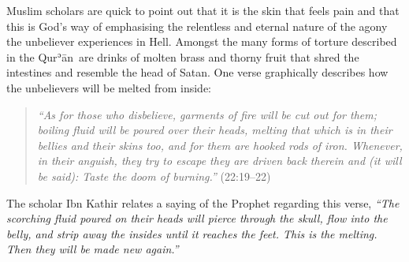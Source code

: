 \documentclass[12pt]{memoir}
\def\´{ʾ} %
\def \Quran{Qur\-\´ān} %
\newcommand{\QRef}[1]{{\color{darkblue}#1}}
\begin{document}
Muslim scholars are quick to point out that it is the skin
that feels pain and that this is God’s way of emphasising the relentless
and eternal nature of the agony the unbeliever experiences in Hell.
Amongst the many forms of torture described in the \Quran\
are drinks of molten brass and thorny fruit that shred
the intestines and resemble the head of Satan.
One verse graphically describes
how the unbelievers will be melted from inside:

\begin{quote}
\emph{%
“As for those who disbelieve, garments of fire will be cut out for them;
boiling fluid will be poured over their heads,
melting that which is in their bellies and their skins too,
and for them are hooked rods of iron.
Whenever, in their anguish, they try to escape they are driven back therein
and (it will be said): Taste the doom of burning.”}
(\QRef{22:19–22})
\end{quote}

The scholar Ibn Kathir relates a saying of the Prophet regarding this verse,
\emph{“The scorching fluid poured on their heads will pierce through the skull,
flow into the belly, and strip away the insides until it reaches the feet.
This is the melting.
Then they will be made new again.”}
\end{document}
